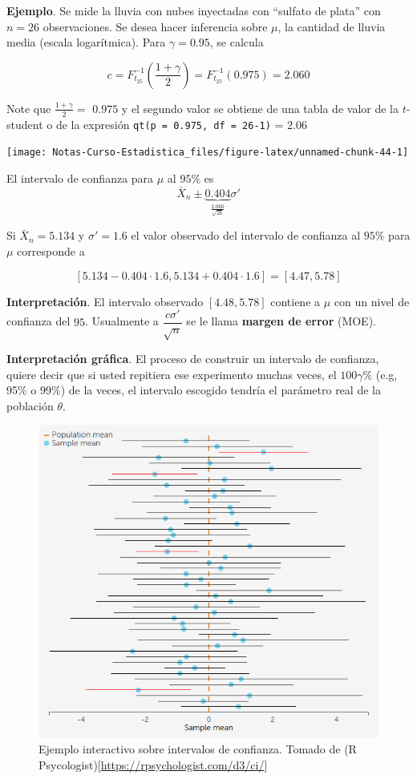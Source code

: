 \documentclass[
  12pt,
]{book}
\begin{document}
\textbf{Ejemplo}. Se mide la lluvia con nubes inyectadas con ``sulfato de plata'' con
\(n=26\) observaciones. Se desea hacer inferencia sobre \(\mu\), la cantidad de
lluvia media (escala logarítmica). Para \(\gamma = 0.95\), se calcula

\[
c=F^{-1}_{t_{25}}\left(\dfrac{1+\gamma}2\right) =F^{-1}_{t_{25}}(0.975) = 2.060
\]

Note que \(\frac{1+\gamma}{2}=\) \(0.975\) y el segundo valor se obtiene de
una tabla de valor de la \(t\)-student o de la expresión \texttt{qt(p\ =\ 0.975,\ df\ =\ 26-1)} = \(2.06\)

\begin{center}\texttt{[image: Notas-Curso-Estadistica\_files/figure-latex/unnamed-chunk-44-1]} \end{center}

El intervalo de confianza para \(\mu\) al \(95\%\) es \[\bar X_n \pm
\underbrace{0.404}_{\frac{2.060}{\sqrt{26}}}\sigma'\]

Si \(\bar X_n = 5.134\) y \(\sigma' = 1.6\) el valor observado del intervalo de confianza
al \(95\%\) para \(\mu\) corresponde a

\[[5.134-0.404\cdot1.6, 5.134+0.404\cdot1.6]= [4.47,5.78]\]

\textbf{Interpretación}. El intervalo observado \([4.48,5.78]\) contiene a \(\mu\) con un
nivel de confianza del \(95%
\). Usualmente a \(\dfrac{c\sigma'}{\sqrt{n}}\) se le llama
\textbf{margen de error} (MOE).

\textbf{Interpretación gráfica}. El proceso de construir un intervalo de confianza,
quiere decir que si usted repitiera ese experimento muchas veces, el
\(100\gamma\%\) (e.g, 95\% o 99\%) de la veces, el intervalo escogido tendría el
parámetro real de la población \(\theta\).

\begin{figure}
\centering
\includegraphics{./images/interpreting_confidence_intervals.png}
\caption{Ejemplo interactivo sobre intervalos de confianza. Tomado de (R Psycologist){[}\url{https://rpsychologist.com/d3/ci/}{]}}
\end{figure}
\end{document}
